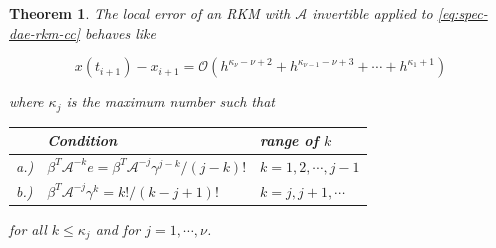 \documentclass[]{book}
\newtheorem{theorem}{Theorem}[chapter]
\theoremstyle{definition}
\theoremstyle{definition}
\theoremstyle{definition}
\theoremstyle{remark}
\begin{document}
\begin{theorem}
\protect\hypertarget{thm:local-consistency-error-rkm-lcc}{}{\label{thm:local-consistency-error-rkm-lcc} }The local error of an RKM with \(\mathcal A\) invertible applied to \eqref{eq:spec-dae-rkm-cc} behaves like

\[
x(t_{i+1}) - x_{i+1} = \mathcal O(h^{\kappa_\nu - \nu + 2} + h^{\kappa_{\nu-1} - \nu + 3} + \cdots + h^{\kappa_1 +1})
\]

where \(\kappa_j\) is the maximum number such that

\begin{longtable}[]{@{}lll@{}}
\toprule
\begin{minipage}[b]{0.07\columnwidth}\raggedright
\strut
\end{minipage} & \begin{minipage}[b]{0.53\columnwidth}\raggedright
Condition\strut
\end{minipage} & \begin{minipage}[b]{0.31\columnwidth}\raggedright
range of \(k\)\strut
\end{minipage}\tabularnewline
\midrule
\endhead
\begin{minipage}[t]{0.07\columnwidth}\raggedright
a.)\strut
\end{minipage} & \begin{minipage}[t]{0.53\columnwidth}\raggedright
\(\beta^T\mathcal A^{-k}e = \beta^T\mathcal A^{-j}\gamma^{j-k} / (j-k)!\)\strut
\end{minipage} & \begin{minipage}[t]{0.31\columnwidth}\raggedright
\(k=1,2,\cdots,j-1\)\strut
\end{minipage}\tabularnewline
\begin{minipage}[t]{0.07\columnwidth}\raggedright
b.)\strut
\end{minipage} & \begin{minipage}[t]{0.53\columnwidth}\raggedright
\(\beta^T\mathcal A^{-j}\gamma^k = k! / (k-j+1)!\)\strut
\end{minipage} & \begin{minipage}[t]{0.31\columnwidth}\raggedright
\(k=j,j+1,\cdots\)\strut
\end{minipage}\tabularnewline
\bottomrule
\end{longtable}

for all \(k\leq \kappa_j\) and for \(j=1, \cdots, \nu\).
\end{theorem}
\end{document}
